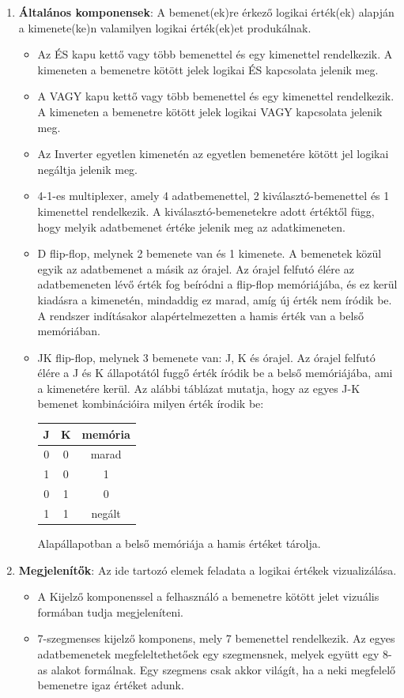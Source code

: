 \begin{enumerate}
\item \textbf{Általános komponensek}: A bemenet(ek)re érkező logikai érték(ek) alapján a kimenete(ke)n valamilyen logikai érték(ek)et produkálnak.
\begin{itemize}
\setlength{\itemsep}{0cm}%
\setlength{\parskip}{0cm}%
\item Az ÉS kapu kettő vagy több bemenettel és egy kimenettel rendelkezik. A kimeneten a bemenetre kötött jelek logikai ÉS kapcsolata jelenik meg. 
\item A VAGY kapu kettő vagy több bemenettel és egy kimenettel rendelkezik. A kimeneten a bemenetre kötött jelek logikai VAGY kapcsolata jelenik meg.
\item Az Inverter egyetlen kimenetén az egyetlen bemenetére kötött jel logikai negáltja jelenik meg.
\item 4-1-es multiplexer, amely 4 adatbemenettel, 2 kiválasztó-bemenettel és 1 kimenettel rendelkezik. A kiválasztó-bemenetekre adott értéktől függ, hogy melyik adatbemenet értéke jelenik meg az adatkimeneten.
\item D flip-flop, melynek 2 bemenete van és 1 kimenete. A bemenetek közül egyik az adatbemenet a másik az órajel. Az órajel felfutó élére az adatbemeneten lévő érték fog beíródni a flip-flop memóriájába, és ez kerül kiadásra a kimenetén, mindaddig ez marad, amíg új érték nem íródik be. A rendszer indításakor alapértelmezetten a hamis érték van a belső memóriában.
\item JK flip-flop, melynek 3 bemenete van: J, K és órajel. Az órajel felfutó élére a J és K állapotától fuggő érték íródik be a belső memóriájába, ami a kimenetére kerül. Az alábbi táblázat mutatja, hogy az egyes J-K bemenet kombinációira milyen érték írodik be:
\begin{center}
\begin{tabular}{|c|c|c|}
\hline
J & K & memória\\\hline
0 & 0 & marad\\\hline
1 & 0 & 1\\\hline
0 & 1 & 0\\\hline
1 & 1 & negált\\\hline
\end{tabular}
\end{center}
Alapállapotban a belső memóriája a hamis értéket tárolja.
\end{itemize}

\item \textbf{Megjelenítők}: Az ide tartozó elemek feladata a logikai értékek vizualizálása.
\begin{itemize}
\setlength{\itemsep}{0cm}%
\setlength{\parskip}{0cm}%
\item A Kijelző komponenssel a felhasználó a bemenetre kötött jelet vizuális formában tudja megjeleníteni.
\item 7-szegmenses kijelző komponens, mely 7 bemenettel rendelkezik. Az egyes adatbemenetek megfeleltethetőek egy szegmensnek, melyek együtt egy 8-as alakot formálnak. Egy szegmens csak akkor világít, ha a neki megfelelő bemenetre igaz értéket adunk.
\end{itemize}


\end{enumerate}
